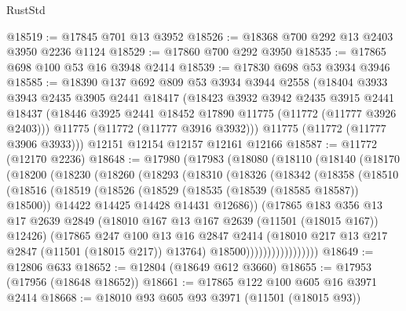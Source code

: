 \begin{lexlean}{RustStd}
\begin{coremodule}
@18519 := @17845 @701 @13 @3952
@18526 := @18368 @700 @292 @13 @2403 @3950 @2236 @1124
@18529 := @17860 @700 @292 @3950
@18535 := @17865 @698 @100 @53 @16 @3948 @2414
@18539 := @17830 @698 @53 @3934 @3946
@18585 := @18390
    @137
    @692
    @809
    @53
    @3934
    @3944
    @2558
    (@18404
      @3933
      @3943
      @2435
      @3905
      @2441
      @18417
      (@18423
        @3932
        @3942
        @2435
        @3915
        @2441
        @18437
        (@18446 @3925 @2441 @18452 @17890 @11775 (@11772 (@11777 @3926 @2403)))
        @11775
        (@11772 (@11777 @3916 @3932)))
      @11775
      (@11772 (@11777 @3906 @3933)))
    @12151
    @12154
    @12157
    @12161
    @12166
@18587 := @11772 (@12170 @2236)
@18648 := @17980
    (@17983
      (@18080
        (@18110
          (@18140
            (@18170
              (@18200
                (@18230
                  (@18260
                    (@18293
                      (@18310
                        (@18326
                          (@18342
                            (@18358
                              (@18510
                                (@18516
                                  (@18519
                                    (@18526
                                      (@18529 (@18535 (@18539 (@18585 @18587)) @18500))
                                      @14422
                                      @14425
                                      @14428
                                      @14431
                                      @12686))
                                  (@17865
                                    @183
                                    @356
                                    @13
                                    @17
                                    @2639
                                    @2849
                                    (@18010 @167 @13 @167 @2639 (@11501 (@18015 @167)) @12426)
                                    (@17865
                                      @247
                                      @100
                                      @13
                                      @16
                                      @2847
                                      @2414
                                      (@18010 @217 @13 @217 @2847 (@11501 (@18015 @217)) @13764)
                                      @18500)))))))))))))))))
@18649 := @12806 @633
@18652 := @12804 (@18649 @612 @3660)
@18655 := @17953 (@17956 (@18648 @18652))
@18661 := @17865 @122 @100 @605 @16 @3971 @2414
@18668 := @18010 @93 @605 @93 @3971 (@11501 (@18015 @93))

\end{coremodule}
\end{lexlean}
